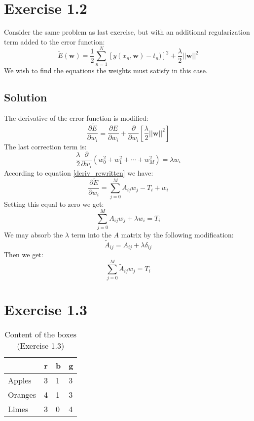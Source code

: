 \documentclass[12pt, a4paper]{article}
\numberwithin{equation}{section}
\begin{document}
\section{Exercise 1.2}
Consider the same problem as last exercise, but with an additional regularization term added to the error function:
\begin{equation}
\tilde{E}(\mathbf{w})=\frac{1}{2}\sum_{n=1}^N\left[y(x_n,\mathbf{w})-t_n)\right]^2+\frac{\lambda}{2}||\mathbf{w}||^2
\end{equation}
We wish to find the equations the weights must satisfy in this case.

\subsection{Solution}
The derivative of the error function is modified:
\begin{equation}
\frac{\partial\tilde{E}}{\partial w_i}=\frac{\partial E}{\partial w_i}+\frac{\partial}{\partial w_i}\left[\frac{\lambda}{2}||\mathbf{w}||^2\right]
\end{equation}
The last correction term is:
\begin{equation}
\frac{\lambda}{2}\frac{\partial}{\partial w_i}(w_0^2+w_1^2+\cdots+w_M^2)=\lambda w_i
\end{equation}
According to equation \ref{deriv_rewritten} we have:
\begin{equation}
\frac{\partial\tilde{E}}{\partial w_i}=\sum_{j=0}^M A_{ij}w_j-T_i+w_i
\end{equation}
Setting this equal to zero we get:
\begin{equation}
\sum_{j=0}^M A_{ij}w_j+\lambda w_i=T_i
\end{equation}
We may absorb the $\lambda$ term into the $A$ matrix by the following modification:
\begin{equation}
\tilde{A}_{ij}=A_{ij}+\lambda\delta_{ij}
\end{equation}
Then we get:
\begin{equation}
\sum_{j=0}^M\tilde{A}_{ij}w_j=T_i
\end{equation}

\section{Exercise 1.3}

\begin{table}
\centering
\caption{Content of the boxes (Exercise 1.3)}
\label{table:boxes}
\begin{tabular}{l|l|l|l|}
\cline{2-4}
\multicolumn{1}{c|}{}         & \multicolumn{1}{c|}{r} & b & g \\ \hline
\multicolumn{1}{|l|}{Apples}  & 3                      & 1 & 3 \\ \hline
\multicolumn{1}{|l|}{Oranges} & 4                      & 1 & 3 \\ \hline
\multicolumn{1}{|l|}{Limes}   & 3                      & 0 & 4 \\ \hline
\end{tabular}
\end{table}
\end{document}

